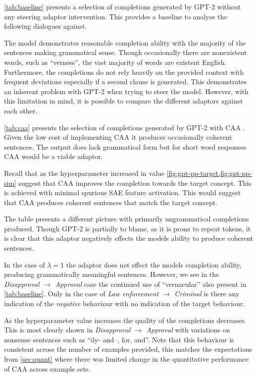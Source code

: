 \cref{tab:baseline} presents a selection of completions generated by GPT-2 \citep{gpt-2} without any steering adaptor intervention.
This provides a baseline to analyse the following dialogues against.

The model demonstrates reasonable completion ability with the majority of the sentences making grammatical sense.
Though occasionally there are nonexistent words, such as ``verness'', the vast majority of words are existent English.
Furthermore, the completions do not rely heavily on the provided context with frequent deviations especially if a second clause is generated.
This demonstrates an inherent problem with GPT-2 when trying to steer the model.
However, with this limitation in mind, it is possible to compare the different adaptors against each other.




\cref{tab:caa} presents the selection of completions generated by GPT-2 with CAA \citep{caa}.
Given the low cost of implementing CAA it produces occasionally coherent sentences.
The output does lack grammatical form but for short word responses CAA would be a viable adaptor.

Recall that as the hyperparameter increased in value \cref{fig:gpt-pp-target,fig:gpt-pp-sim} suggest that CAA improves the completion towards the target concept.
This is achieved with minimal spurious SAE feature activation.
This would suggest that CAA produces coherent sentences that match the target concept.

The table presents a different picture with primarily ungrammatical completions produced.
Though GPT-2 is partially to blame, as it is prone to repeat tokens, it is clear that this adaptor negatively effects the models ability to produce coherent sentences.

In the case of $\lambda = 1$ the adaptor does not effect the models completion ability, producing grammatically meaningful sentences.
However, we see in the \emph{Disapproval $\to$ Approval} case the continued use of ``vernacular'' also present in \cref{tab:baseline}.
Only in the case of \emph{Law enforcement $\to$ Criminal} is there any indication of the \emph{negative} behaviour with no indication of the target behaviour.

As the hyperparameter value increases the quality of the completions decreases.
This is most clearly shown in \emph{Disapproval $\to$ Approval} with variations on nonsense sentences such as ``ily- and--, for, and''.
Note that this behaviour is consistent across the number of examples provided, this matches the expectations from \cref{sec:quant} where there was limited change in the quantitative performance of CAA across example sets.

